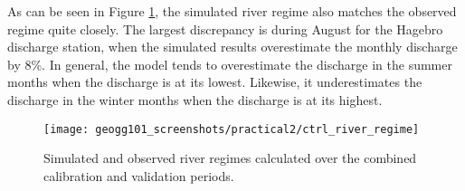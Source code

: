 \documentclass{article}
\begin{document}
\begin{table}[!h]
    \centering
\end{table}

As can be seen in Figure \ref{fig:ctrl_river_regime}, the simulated river regime also matches the observed regime quite closely. The largest discrepancy is during August for the Hagebro discharge station, when the simulated results overestimate the monthly discharge by 8\%. In general, the model tends to overestimate the discharge in the summer months when the discharge is at its lowest. Likewise, it underestimates the discharge in the winter months when the discharge is at its highest.

\begin{figure}[!h]
    \centering
    \texttt{[image: geogg101\_screenshots/practical2/ctrl\_river\_regime]}
    \caption{Simulated and observed river regimes calculated over the combined calibration and validation periods.}
    \label{fig:ctrl_river_regime}
\end{figure}


\newpage
\end{document}
